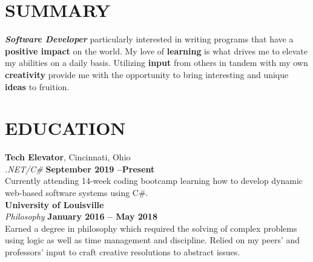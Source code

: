 \documentclass[margin,line]{resume}
\begin{document}
\begin{resume}

    \vspace{-1mm}

    \section{\mysidestyle \textbf{\large{S}\small{UMMARY}}}

    \textbf{\textsl{Software Developer}} particularly interested in writing programs that have a \textbf{positive impact} on the world. My love of \textbf{learning} is what drives me to elevate my abilities on a daily basis. Utilizing \textbf{input} from others in tandem with my own \textbf{creativity} provide me with the opportunity to bring interesting and unique \textbf{ideas} to fruition.

    \vspace{1mm}

\sectionline

\vspace{2mm}
    \section{\mysidestyle \textbf{\large{E}\small{DUCATION}}}

    \textbf{\listing Tech Elevator}, Cincinnati, Ohio \vspace{1mm}\\
    \textsl{.NET/C\#} \hfill \textbf{September 2019 --Present}\vspace{1mm}\\\vspace{0mm}%
     Currently attending 14-week coding bootcamp learning how to develop dynamic web-based software systems using C\#. \vspace{-5mm}\\

    \textbf{\listing University of Louisville} \vspace{1mm}\\
    \textsl{Philosophy} \hfill \textbf{January 2016 -- May 2018}\vspace{1mm}\\\vspace{0mm}%
     Earned a degree in philosophy which required the solving of complex problems using logic as well as time management and discipline. Relied on my peers' and professors' input to craft creative resolutions to abstract issues. 


\end{resume}
\end{document}
